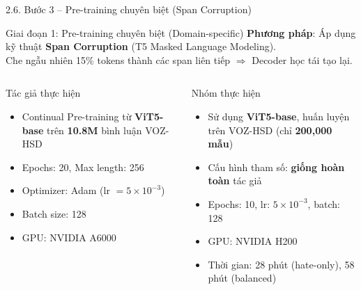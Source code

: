 \documentclass[11pt, aspectratio=169]{beamer}
\begin{document}
\begin{frame}[shrink=5]{2.6. Bước 3 -- Pre-training chuyên biệt (Span Corruption)}

\begin{block}{Giai đoạn 1: Pre-training chuyên biệt (Domain-specific)}
  \textbf{Phương pháp}: Áp dụng kỹ thuật \textbf{Span Corruption} (T5 Masked Language Modeling).\\
  Che ngẫu nhiên 15\% tokens thành các span liên tiếp $\Rightarrow$ Decoder học tái tạo lại.
\end{block}

\vspace{0.2cm}
\begin{columns}[T]
  \begin{block}{Tác giả thực hiện}
    \begin{itemize}
      \item Continual Pre-training từ \textbf{ViT5-base} trên \textbf{10.8M} bình luận VOZ-HSD
      \item Epochs: 20, Max length: 256
      \item Optimizer: Adam (lr $= 5 \times 10^{-3}$)
      \item Batch size: 128
      \item GPU: NVIDIA A6000
    \end{itemize}
  \end{block}

  \begin{block}{Nhóm thực hiện}
    \begin{itemize}
      \item Sử dụng \textbf{ViT5-base}, huấn luyện trên VOZ-HSD (chỉ \textbf{200,000 mẫu})
      \item Cấu hình tham số: \textbf{giống hoàn toàn} tác giả
      \item Epochs: 10, lr: $5 \times 10^{-3}$, batch: 128
      \item GPU: NVIDIA H200
      \item Thời gian: 28 phút (hate-only), 58 phút (balanced)
    \end{itemize}
  \end{block}
\end{columns}
\end{frame}
\end{document}
